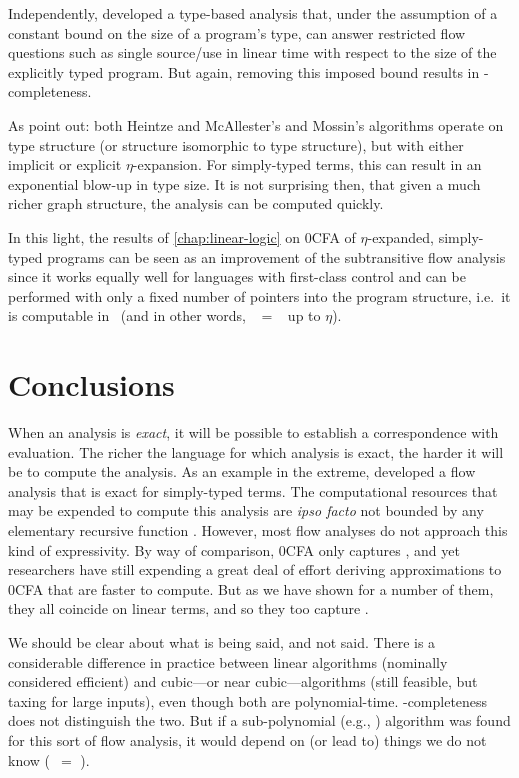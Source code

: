 Independently, \citet{mossin-njc98} developed a type-based analysis
that, under the assumption of a constant bound on the size of a
program's type, can answer restricted flow questions such as single
source/use in linear time with respect to the size of the explicitly
typed program.  But again, removing this imposed bound results in
\ptime-completeness.

As \citet{hankin-games} point out: both Heintze and McAllester's and
Mossin's algorithms operate on type structure (or structure isomorphic
to type structure), but with either implicit or explicit
$\eta$-expansion.  For simply-typed terms, this can result in an
exponential blow-up in type size.  It is not surprising then, that
given a much richer graph structure, the analysis can be computed
quickly.  

In this light, the results of \autoref{chap:linear-logic} on 0CFA of
$\eta$-expanded, simply-typed programs can be seen as an improvement
of the subtransitive flow analysis since it works equally well for
languages with first-class control and can be performed with only a
fixed number of pointers into the program structure, i.e.~it is
computable in \logspace\ (and in other words, \ptime\ $=$ \logspace\
up to $\eta$).










\section{Conclusions}

When an analysis is {\em exact}, it will be possible to establish a
correspondence with evaluation.  The richer the language for which
analysis is exact, the harder it will be to compute the analysis.  As
an example in the extreme, \citet{mossin-sas97} developed a flow
analysis that is exact for simply-typed terms.  The computational
resources that may be expended to compute this analysis are {\em ipso
facto} not bounded by any elementary recursive function
\cite{statman79}.  However, most flow analyses do not approach this kind
of expressivity.  By way of comparison, 0CFA only captures \ptime, and
yet researchers have still expending a great deal of effort deriving
approximations to 0CFA that are faster to compute.  But as we have
shown for a number of them, they all coincide on linear terms, and so
they too capture \ptime.

We should be clear about what is being said, and not said.  There is a
considerable difference in practice between linear algorithms
(nominally considered efficient) and cubic---or near
cubic---algorithms (still feasible, but taxing for large inputs), even
though both are polynomial-time.  \ptime-completeness does not
distinguish the two.  But if a sub-polynomial (e.g., \logspace)
algorithm was found for this sort of flow analysis, it would depend on
(or lead to) things we do not know (\logspace\ $=$ \ptime).  

